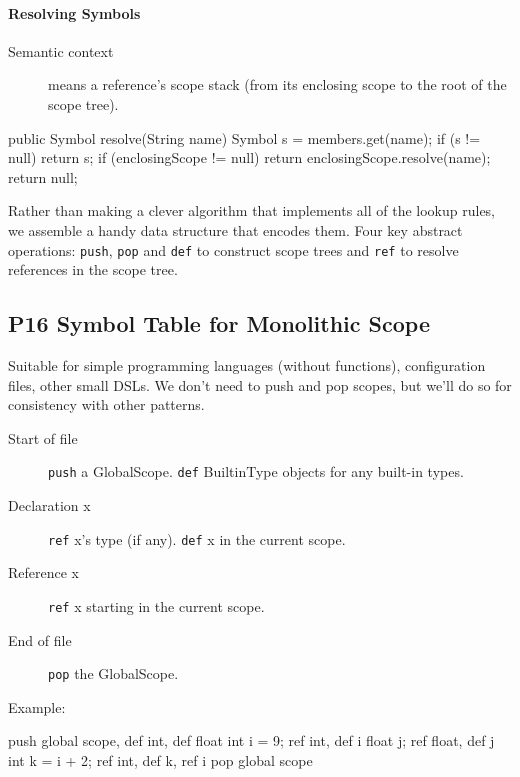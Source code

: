 \paragraph{Resolving Symbols}

\begin{description}
\item[Semantic context] means a reference's scope stack
(from its enclosing scope to the root of the scope tree).
\end{description}

\begin{verbatimtab}
public Symbol resolve(String name) {
	Symbol s = members.get(name);
	if (s != null) return s;
	if (enclosingScope != null)
		return enclosingScope.resolve(name);
	return null;
}
\end{verbatimtab}

Rather than making a clever algorithm that implements all of the lookup rules,
we assemble a handy data structure that encodes them.
Four key abstract operations:
\verb=push=, \verb=pop= and \verb=def= to construct scope trees
and \verb=ref= to resolve references in the scope tree.


\subsection{P16 Symbol Table for Monolithic Scope}

Suitable for simple programming languages (without functions),
configuration files, other small DSLs.
We don't need to push and pop scopes,
but we'll do so for consistency with other patterns.

\begin{description}
\item[Start of file]
\verb=push= a GlobalScope.
\verb=def= BuiltinType objects for any built-in types.

\item[Declaration x]
\verb=ref= x's type (if any). \verb=def= x in the current scope.

\item[Reference x]
\verb=ref= x starting in the current scope.

\item[End of file]
\verb=pop= the GlobalScope.
\end{description}

Example:
\begin{verbatimtab}
		push global scope, def int, def float
int i = 9;	ref int, def i
float j;	ref float, def j
int k = i + 2;	ref int, def k, ref i
		pop global scope
\end{verbatimtab}


